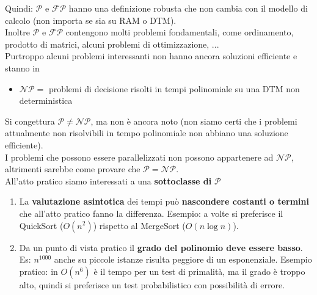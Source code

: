 Quindi: $\mathcal{P}$ e $\mathcal{FP}$ hanno una definizione robusta che non cambia con il modello di calcolo (non importa se sia su RAM o DTM).\\
Inoltre $\mathcal{P}$ e $\mathcal{FP}$ contengono molti problemi fondamentali, come ordinamento, prodotto di matrici, alcuni problemi di ottimizzazione, ...  \\

Purtroppo alcuni problemi interessanti non hanno ancora soluzioni efficiente e stanno in 
\begin{itemize}
	\item $\mathcal{NP} =$ problemi di decisione risolti in tempi polinomiale su una DTM non deterministica
\end{itemize}
Si congettura $\mathcal{P} \neq \mathcal{NP}$, ma non è ancora noto (non siamo certi che i problemi attualmente non risolvibili in tempo polinomiale non abbiano una soluzione efficiente).\\

I problemi che possono essere parallelizzati non possono appartenere ad $\mathcal{NP}$, altrimenti sarebbe come provare che $\mathcal{P} = \mathcal{NP}$.\\

All'atto pratico siamo interessati a una \textbf{sottoclasse di} $\mathcal{P}$
\begin{enumerate}
	\item La \textbf{valutazione asintotica} dei tempi può \textbf{nascondere costanti o termini} che all'atto pratico fanno la differenza. Esempio: a volte si preferisce il QuickSort ($O(n^2)$) rispetto al MergeSort ($O(n \log n)$).
	\item Da un punto di vista pratico il \textbf{grado del polinomio deve essere basso}. Es: $n^{1000}$ anche su piccole istanze risulta peggiore di un esponenziale. Esempio pratico: in $O(n^6)$ è il tempo per un test di primalità, ma il grado è troppo alto, quindi si preferisce un test probabilistico con possibilità di errore.
\end{enumerate}